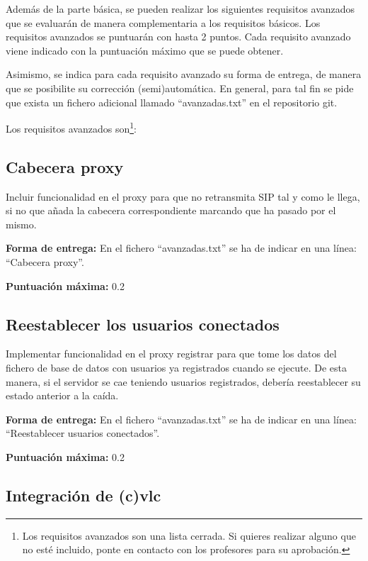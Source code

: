 \documentclass[a4paper,11pt]{article}
\begin{document}
Además de la parte básica, se pueden realizar los siguientes
requisitos avanzados que se evaluarán de manera complementaria a los requisitos básicos.
Los requisitos avanzados se puntuarán con hasta 2 puntos. Cada requisito avanzado viene indicado con la puntuación máximo que se puede obtener.

Asimismo, se indica para cada requisito avanzado su forma de entrega, de manera que se posibilite su corrección (semi)automática. En general, para tal fin se pide que exista un fichero adicional llamado ``avanzadas.txt'' en el repositorio git.


Los requisitos avanzados son\footnote{Los requisitos avanzados son una lista cerrada. Si quieres realizar alguno que no esté incluido, ponte en contacto con los profesores para su aprobación.}:

\subsection*{Cabecera proxy}

Incluir funcionalidad en el proxy para que no retransmita SIP tal y como le llega, si no que añada la cabecera correspondiente marcando que ha pasado por el mismo.

  {\bf Forma de entrega:} En el fichero ``avanzadas.txt'' se ha de indicar en una línea: ``Cabecera proxy''.

  {\bf Puntuación máxima:} 0.2

\subsection*{Reestablecer los usuarios conectados}

Implementar funcionalidad en el proxy registrar para que tome los datos del fichero de base de datos con usuarios ya registrados cuando se ejecute. De esta manera, si el servidor se cae teniendo usuarios registrados, debería reestablecer su estado anterior a la caída. 


  {\bf Forma de entrega:} En el fichero ``avanzadas.txt'' se ha de indicar en una línea: ``Reestablecer usuarios conectados''.

  {\bf Puntuación máxima:} 0.2


\subsection*{Integración de (c)vlc}
\end{document}
